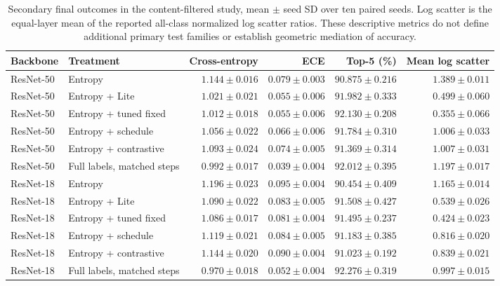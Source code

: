 \documentclass[10pt,a4paper,twocolumn]{article}
\begin{document}
\begin{table}[tbp]
\caption{Secondary final outcomes in the content-filtered study,
mean $\pm$ seed SD over ten paired seeds. Log scatter is the equal-layer
mean of the reported all-class normalized log scatter ratios. These
descriptive metrics do not define additional primary test families or
establish geometric mediation of accuracy.}
\label{tab:solid_secondary}
\centering\footnotesize
\begin{tabular*}{\textwidth}{@{\extracolsep{\fill}}llrrrr@{}}
\toprule
Backbone & Treatment & Cross-entropy & ECE & Top-5 (\%) & Mean log scatter \\
\midrule
ResNet-50 & Entropy & $1.144\pm0.016$ & $0.079\pm0.003$ & $90.875\pm0.216$ & $1.389\pm0.011$ \\
ResNet-50 & Entropy + Lite & $1.021\pm0.021$ & $0.055\pm0.006$ & $91.982\pm0.333$ & $0.499\pm0.060$ \\
ResNet-50 & Entropy + tuned fixed & $1.012\pm0.018$ & $0.055\pm0.006$ & $92.130\pm0.208$ & $0.355\pm0.066$ \\
ResNet-50 & Entropy + schedule & $1.056\pm0.022$ & $0.066\pm0.006$ & $91.784\pm0.310$ & $1.006\pm0.033$ \\
ResNet-50 & Entropy + contrastive & $1.093\pm0.024$ & $0.074\pm0.005$ & $91.369\pm0.314$ & $1.007\pm0.031$ \\
ResNet-50 & Full labels, matched steps & $0.992\pm0.017$ & $0.039\pm0.004$ & $92.012\pm0.395$ & $1.197\pm0.017$ \\
\midrule
ResNet-18 & Entropy & $1.196\pm0.023$ & $0.095\pm0.004$ & $90.454\pm0.409$ & $1.165\pm0.014$ \\
ResNet-18 & Entropy + Lite & $1.090\pm0.022$ & $0.083\pm0.005$ & $91.508\pm0.427$ & $0.539\pm0.026$ \\
ResNet-18 & Entropy + tuned fixed & $1.086\pm0.017$ & $0.081\pm0.004$ & $91.495\pm0.237$ & $0.424\pm0.023$ \\
ResNet-18 & Entropy + schedule & $1.119\pm0.021$ & $0.084\pm0.005$ & $91.183\pm0.385$ & $0.816\pm0.020$ \\
ResNet-18 & Entropy + contrastive & $1.144\pm0.020$ & $0.090\pm0.004$ & $91.023\pm0.192$ & $0.839\pm0.021$ \\
ResNet-18 & Full labels, matched steps & $0.970\pm0.018$ & $0.052\pm0.004$ & $92.276\pm0.319$ & $0.997\pm0.015$ \\
\bottomrule
\end{tabular*}
\end{table}
\end{document}
